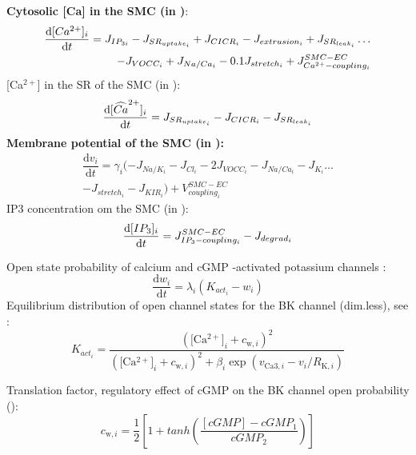 \documentclass[fleqn]{report}
\numberwithin{equation}{section}
\numberwithin{equation}{section}
\newcommand{\Cai}{\text{[Ca$^{2+}]_i$}}
\begin{document}
	\textbf{Cytosolic [\gls{Ca}] in the \gls{SMC} (in \uM)}:
	\begin{equation}\label{eq:ci}
	\begin{split}
	\dfrac{\mathrm{d}[Ca^{2+}]_{i}}{\mathrm{d}t} = J_{IP_{3i}} - J_{SR_{uptake_{i}}} + J_{CICR_{i}} - J_{extrusion_{i}} +  J_{SR_{leak_{i}}}\dots \\
	 - J_{VOCC_{i}} + J_{Na/Ca_{i}}  - 0.1J_{stretch_{i}} + J_{Ca^{2+}-coupling_{i}}^{SMC-EC}
	\end{split} 
	\end{equation}
	[Ca$^{2+}$] in the \gls{SR} of the \gls{SMC} (in \uM):
	\begin{equation} \label{eq:si}
	\dfrac{\mathrm{d}[\widehat{Ca}^{2+}]_{i}}{\mathrm{d}t} =  J_{SR_{uptake_{i}}} - J_{CICR_{i}} - J_{SR_{leak_{i}}}
	\end{equation}
	\textbf{Membrane potential of the \gls{SMC} (in \mV):}
	\begin{equation} \label{eq:vi}
	\begin{split}
	\dfrac{\mathrm{d}v_{i}}{\mathrm{d}t} = \gamma_{i}( -J_{Na/K_{i}} - J_{Cl_{i}} - 2J_{VOCC_{i}}- J_{Na/Ca_{i}} - J_{K_{i}} \dots \\
	- J_{stretch_{i}} - J_{KIR_{i}} ) +V^{SMC-EC}_{coupling_{i}}
	\end{split}
	\end{equation}
		\gls{IP3} concentration om the \gls{SMC} (in \uM): 
		\begin{equation} \label{eq:dIidt}
		\dfrac{\mathrm{d}[IP_{3}] _{i}}{\mathrm{d}t} = J^{SMC-EC}_{IP_{3}-coupling_{i}} - J_{degrad_{i}}
		\end{equation}
		
	Open state probability of calcium and cGMP -activated potassium channels :
	\begin{equation} \label{eq:dwidt}
	\dfrac{\mathrm{d}w_{i}}{\mathrm{d}t} =  \lambda_{i} \left( K_{act_{i}} - w_{i} \right)
	\end{equation}
					Equilibrium distribution of open channel states for the BK channel (dim.less), see \citet{Dormanns2014}:  %
					\begin{equation} \label{eq:K_act}
						K_{act_{i}}= \frac{(\Cai + c_{\text{w},i})^2}{(\Cai + c_{\text{w},i})^2 + \beta_i \exp(v_{\text{Ca}3,i} - v_i/R_{\text{K},i} )}
					\end{equation}

					Translation factor, regulatory effect of cGMP on the BK channel open probability (\uM): %
					\begin{equation} \label{eq:c_w_i}
						c_{\text{w},i} = \frac{1}{2}\left[ 1+tanh(\frac{[cGMP]-cGMP_1}{cGMP_2})\right] 
					\end{equation}
					
\end{document}
